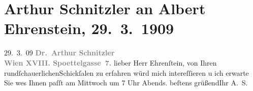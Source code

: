 

               \section[Arthur Schnitzler an Albert Ehrenstein, 29. 3. 1909]{ Arthur Schnitzler an Albert Ehrenstein, 29. 3. 1909}\nopagebreak{}\rehead{ }\begin{ledgroupsized}[t]{13cm}\normalsize\beginnumbering{} \toendnotes[C]{\smallbreak\pagebreak[2]} 
\toendnotes[C]{\smallbreak}\pstart
           \raggedleft{}{\pb}29. 3. 09\pend
           \pstart
           \textcolor{gray}{\textbf{Dr. Arthur Schnitzler}}{\\}\textcolor{gray}{\textbf{Wien XVIII. Spoettelgasse 7.}}\pend
           \pstart{}lieber Herr Ehrenſtein,\pend\pstart
           von Ihren rundſchauerlichenSchickſalen zu erfahren würd mich
                    intereſſieren u ich erwarte Sie we{\geminationn}s Ihnen paſſt am
                    Mittwoch um 7 Uhr Abends.\pend
           \pstart beſtens grüßend\hspace*{1.5em}Ihr \spacefill\mbox{A. S.}\pend{}          \endnumbering{}\end{ledgroupsized}  \newcommand{\dateiname}{L01836}\newcommand{\titel}{Arthur Schnitzler an Albert Ehrenstein, 29. 3. 1909}\newcommand{\editorInnen}{Martin Anton Müller und Gerd-Hermann Susen}
      